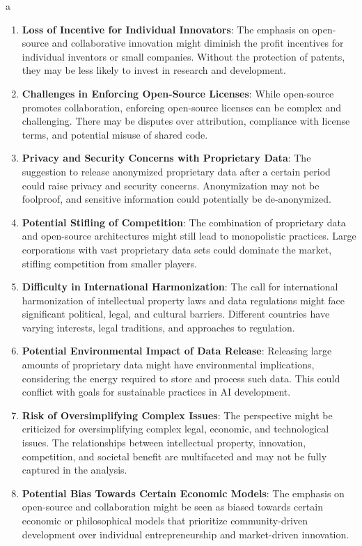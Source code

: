 a\documentclass{article}[10pt]
\begin{document}
\begin{enumerate}
    \item \textbf{Loss of Incentive for Individual Innovators}: The emphasis on open-source and collaborative innovation might diminish the profit incentives for individual inventors or small companies. Without the protection of patents, they may be less likely to invest in research and development.
    \item \textbf{Challenges in Enforcing Open-Source Licenses}: While open-source promotes collaboration, enforcing open-source licenses can be complex and challenging. There may be disputes over attribution, compliance with license terms, and potential misuse of shared code.
    \item \textbf{Privacy and Security Concerns with Proprietary Data}: The suggestion to release anonymized proprietary data after a certain period could raise privacy and security concerns. Anonymization may not be foolproof, and sensitive information could potentially be de-anonymized.
    \item \textbf{Potential Stifling of Competition}: The combination of proprietary data and open-source architectures might still lead to monopolistic practices. Large corporations with vast proprietary data sets could dominate the market, stifling competition from smaller players.
    \item \textbf{Difficulty in International Harmonization}: The call for international harmonization of intellectual property laws and data regulations might face significant political, legal, and cultural barriers. Different countries have varying interests, legal traditions, and approaches to regulation.
    \item \textbf{Potential Environmental Impact of Data Release}: Releasing large amounts of proprietary data might have environmental implications, considering the energy required to store and process such data. This could conflict with goals for sustainable practices in AI development.
    \item \textbf{Risk of Oversimplifying Complex Issues}: The perspective might be criticized for oversimplifying complex legal, economic, and technological issues. The relationships between intellectual property, innovation, competition, and societal benefit are multifaceted and may not be fully captured in the analysis.
    \item \textbf{Potential Bias Towards Certain Economic Models}: The emphasis on open-source and collaboration might be seen as biased towards certain economic or philosophical models that prioritize community-driven development over individual entrepreneurship and market-driven innovation.

\end{enumerate}
\end{document}
